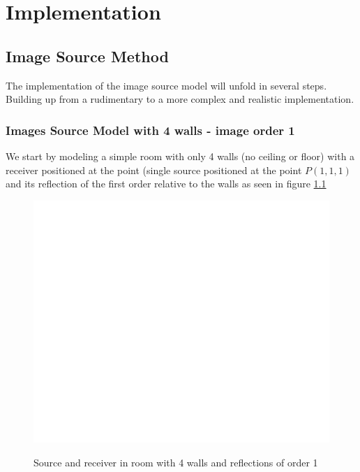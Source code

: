 \chapter{Implementation}
\label{chap:implementation}
\section{Image Source Method}
The implementation of the image source model will unfold in several steps. Building up from a rudimentary to a more complex and realistic implementation.
\subsection{Images Source Model with 4 walls - image order 1}
We start by modeling a simple room with only 4 walls (no ceiling or floor) with a receiver positioned at the point (single source positioned at the point $P(1,1,1)$ and its reflection of the first order relative to the walls as seen in figure \ref{fig:ism_4_1}\\
\begin{figure}
    \centering
    \includegraphics[width=1\textwidth,keepaspectratio]{LaTeX/images/geometrie/ism_4_walls_order_1.png}\\
    \caption{Source and receiver in room with 4 walls and reflections of order 1}
    \label{fig:ism_4_1}
\end{figure}
